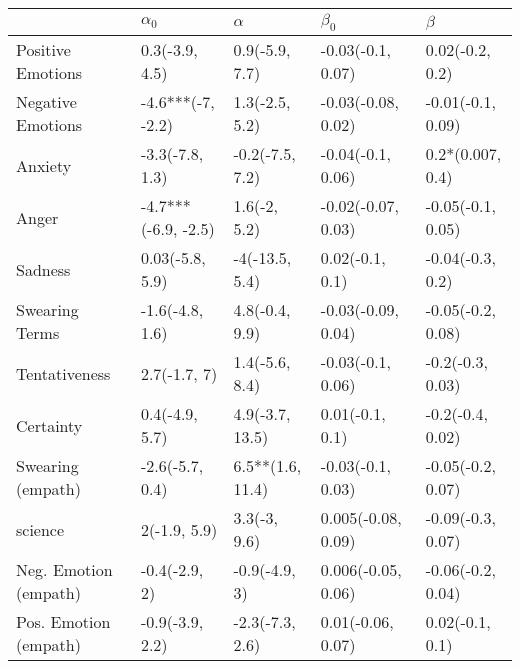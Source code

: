 \begin{tabular}{lllll}
\toprule
{} &           $\alpha_0$ &          $\alpha$ &           $\beta_0$ &            $\beta$ \\
\midrule
Positive Emotions     &       0.3(-3.9, 4.5) &    0.9(-5.9, 7.7) &   -0.03(-0.1, 0.07) &    0.02(-0.2, 0.2) \\
Negative Emotions     &    -4.6***(-7, -2.2) &    1.3(-2.5, 5.2) &  -0.03(-0.08, 0.02) &  -0.01(-0.1, 0.09) \\
Anxiety               &      -3.3(-7.8, 1.3) &   -0.2(-7.5, 7.2) &   -0.04(-0.1, 0.06) &   0.2*(0.007, 0.4) \\
Anger                 &  -4.7***(-6.9, -2.5) &      1.6(-2, 5.2) &  -0.02(-0.07, 0.03) &  -0.05(-0.1, 0.05) \\
Sadness               &      0.03(-5.8, 5.9) &    -4(-13.5, 5.4) &     0.02(-0.1, 0.1) &   -0.04(-0.3, 0.2) \\
Swearing Terms        &      -1.6(-4.8, 1.6) &    4.8(-0.4, 9.9) &  -0.03(-0.09, 0.04) &  -0.05(-0.2, 0.08) \\
Tentativeness         &         2.7(-1.7, 7) &    1.4(-5.6, 8.4) &   -0.03(-0.1, 0.06) &   -0.2(-0.3, 0.03) \\
Certainty             &       0.4(-4.9, 5.7) &   4.9(-3.7, 13.5) &     0.01(-0.1, 0.1) &   -0.2(-0.4, 0.02) \\
Swearing (empath)     &      -2.6(-5.7, 0.4) &  6.5**(1.6, 11.4) &   -0.03(-0.1, 0.03) &  -0.05(-0.2, 0.07) \\
science               &         2(-1.9, 5.9) &      3.3(-3, 9.6) &  0.005(-0.08, 0.09) &  -0.09(-0.3, 0.07) \\
Neg. Emotion (empath) &        -0.4(-2.9, 2) &     -0.9(-4.9, 3) &  0.006(-0.05, 0.06) &  -0.06(-0.2, 0.04) \\
Pos. Emotion (empath) &      -0.9(-3.9, 2.2) &   -2.3(-7.3, 2.6) &   0.01(-0.06, 0.07) &    0.02(-0.1, 0.1) \\
\bottomrule
\end{tabular}
